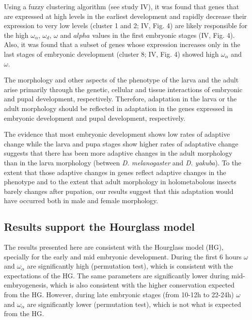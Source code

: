 Using a fuzzy clustering algorithm (see study IV), it was found that genes that are expressed at high levels in the earliest development and rapidly decrease their expression to very low levels (cluster 1 and 2; IV, Fig. 4) are likely responsible for the high $\omega_{\alpha}$, $\omega_{d}$, $\omega$ and $alpha$ values in the first embryonic stages (IV, Fig. 4). Also, it was found that a subset of genes whose expression increases only in the last stages of embryonic development (cluster 8; IV, Fig. 4) showed high $\omega_{\alpha}$ and $\omega$.



%
The morphology and other aspects of the phenotype of the larva and the adult arise primarily through the genetic, cellular and tissue interactions of embryonic and pupal development, respectively.
Therefore, adaptation in the larva or the adult morphology should be reflected in adaptation in the genes expressed in embryonic development and pupal development, respectively.

The evidence that most embryonic development shows low rates of adaptive change while the larva and pupa stages show higher rates of adaptative change suggests that there has been more adaptive changes in the adult morphology than in the larva morphology (between \textit{D. melanogaster} and \textit{D. yakuba}). To the extent that those adaptive changes in genes reflect adaptive changes in the phenotype and to the extent that adult morphology in holometabolous insects barely changes after pupation, our results suggest that this adaptation would have occurred both in male and female morphology.

\subsection{Results support the Hourglass model}

The results presented here are consistent with the Hourglass model (HG), specially for the early and mid embryonic development.
During the first 6 hours $\omega$ and $\omega_{\alpha}$ are significantly high (permutation test), which is consistent with the expectations of the HG.
The same parameters are significantly lower during mid-embryogenesis, which is also consistent with the higher conservation expected from the HG.
However, during late embryonic stages (from 10-12h to 22-24h) $\omega$ and $\omega_{\alpha}$ are significantly lower (permutation test), which is not what is expected from the HG.


